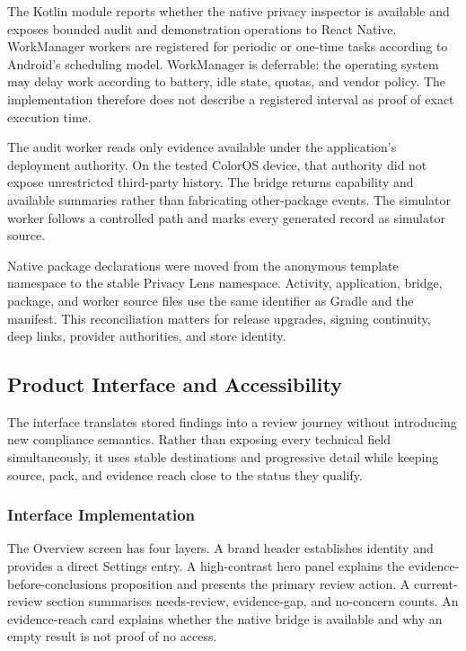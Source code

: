 The Kotlin module reports whether the native privacy inspector is available and exposes bounded audit and demonstration operations to React Native. WorkManager workers are registered for periodic or one-time tasks according to Android's scheduling model. WorkManager is deferrable: the operating system may delay work according to battery, idle state, quotas, and vendor policy. The implementation therefore does not describe a registered interval as proof of exact execution time.

The audit worker reads only evidence available under the application's deployment authority. On the tested ColorOS device, that authority did not expose unrestricted third-party history. The bridge returns capability and available summaries rather than fabricating other-package events. The simulator worker follows a controlled path and marks every generated record as simulator source.

Native package declarations were moved from the anonymous template namespace to the stable Privacy Lens namespace. Activity, application, bridge, package, and worker source files use the same identifier as Gradle and the manifest. This reconciliation matters for release upgrades, signing continuity, deep links, provider authorities, and store identity.

\subsection{Product Interface and Accessibility}

The interface translates stored findings into a review journey without introducing new compliance semantics. Rather than exposing every technical field simultaneously, it uses stable destinations and progressive detail while keeping source, pack, and evidence reach close to the status they qualify.

\subsubsection{Interface Implementation}

The Overview screen has four layers. A brand header establishes identity and provides a direct Settings entry. A high-contrast hero panel explains the evidence-before-conclusions proposition and presents the primary review action. A current-review section summarises needs-review, evidence-gap, and no-concern counts. An evidence-reach card explains whether the native bridge is available and why an empty result is not proof of no access.


